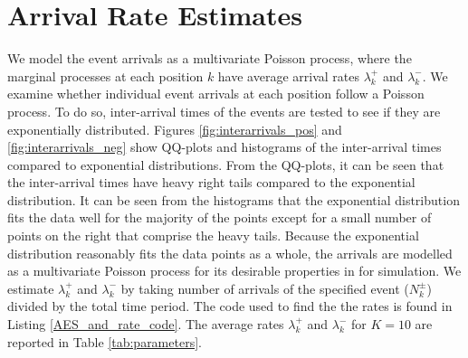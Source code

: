 \section{Arrival Rate Estimates}\label{ch:poisson}
We model the event arrivals as a multivariate Poisson process, where the marginal processes at each position $k$ have average arrival rates $\lambda^+_k$ and $\lambda^-_k$. We examine whether individual event arrivals at each position follow a Poisson process. To do so, inter-arrival times of the events are tested to see if they are exponentially distributed. Figures \ref{fig:interarrivals_pos} and \ref{fig:interarrivals_neg} show QQ-plots and histograms of the inter-arrival times compared to exponential distributions. From the QQ-plots, it can be seen that the inter-arrival times have heavy right tails compared to the exponential distribution. It can be seen from the histograms that the exponential distribution fits the data well for the majority of the points except for a small number of points on the right that comprise the heavy tails. Because the exponential distribution reasonably fits the data points as a whole, the arrivals are modelled as a multivariate Poisson process for its desirable properties in for simulation. We estimate $\lambda^+_k$ and $\lambda^-_k$ by taking number of arrivals of the specified event ($N^{\pm}_k$) divided by the total time period. The code used to find the the rates is found in Listing \ref{AES_and_rate_code}. The average rates $\lambda^+_k$ and $\lambda^-_k$ for $K=10$ are reported in Table \ref{tab:parameters}.

